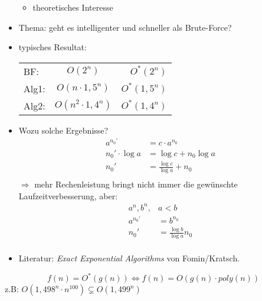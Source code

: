 \begin{itemize}
\begin{itemize}
    \item theoretisches Interesse
   \end{itemize}
   \item Thema: geht es intelligenter und schneller als Brute-Force?
   \item typisches Resultat: \\
   \begin{tabular}{lcr}
      BF: &$O(2^n)$ & $O^*(2^n)$\\ 
      Alg1: &$O(n\cdot 1,5^n)$ &$O^*(1,5^n)$\\ 
      Alg2: &$O(n^2\cdot 1,4^n)$ &$O^*(1,4^n)$\\
   \end{tabular}
   \item Wozu solche Ergebnisse? \\
   \begin{align*}
    a^{n_0'} &= c\cdot a^{n_0}\\
    n_0' \cdot \log a &= \log c + n_0 \log a\\
    n_0' &= \frac{\log c}{\log a} + n_0\\
   \end{align*}
   $\Rightarrow$ mehr Rechenleistung bringt nicht immer die gewünschte Laufzeitverbesserung, aber:
   \begin{align*}
    a^n, b^n, &a < b\\
    a^{n_0'} &= b^{n_0}\\
    n_0' &= \frac{\log b}{\log a} n_0\\
   \end{align*}
   \item Literatur: \textit{Exact Exponential Algorithms} von Fomin/Kratsch.
  \end{itemize}
  
  \begin{definition}[$O^*$-Notation]
   \[f(n) = O^*(g(n)) \Leftrightarrow f(n) = O(g(n)\cdot poly(n))\]
   z.B: $O(1,498^n\cdot n^{100}) \subsetneq O(1,499^n)$
  \end{definition}

